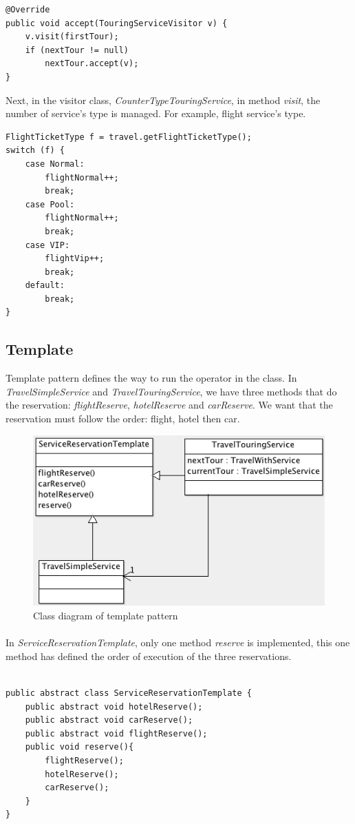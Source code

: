 \begin{lstlisting}
@Override
public void accept(TouringServiceVisitor v) {
	v.visit(firstTour);
	if (nextTour != null)
		nextTour.accept(v);
}
\end{lstlisting}

\newpage
Next, in the visitor class, \textit{CounterTypeTouringService}, in method \textit{visit}, the number of service's type is managed. For example, flight service's type.

\begin{lstlisting}
FlightTicketType f = travel.getFlightTicketType();
switch (f) {
	case Normal:
		flightNormal++;
		break;
	case Pool:
		flightNormal++;
		break;
	case VIP:
		flightVip++;
		break;
	default:
		break;
}

\end{lstlisting}

\newpage
\subsection{Template}

Template pattern defines the way to run the operator in the class. In \textit{TravelSimpleService} and \textit{TravelTouringService}, we have three methods that do the reservation: \textit{flightReserve}, \textit{hotelReserve} and \textit{carReserve}. We want that the reservation must follow the order: flight, hotel then car. 

\begin{figure}[h]
\centering
\includegraphics[width=12cm]{project/images/template.png}
\caption{Class diagram of template pattern}
\end{figure}

\paragraph{}
In \textit{ServiceReservationTemplate}, only one method \textit{reserve} is implemented, this one method has defined the order of execution of the three reservations.

\begin{lstlisting}

public abstract class ServiceReservationTemplate {
	public abstract void hotelReserve();
	public abstract void carReserve();
	public abstract void flightReserve();
	public void reserve(){
		flightReserve();
		hotelReserve();
		carReserve();
	}
}

\end{lstlisting}















